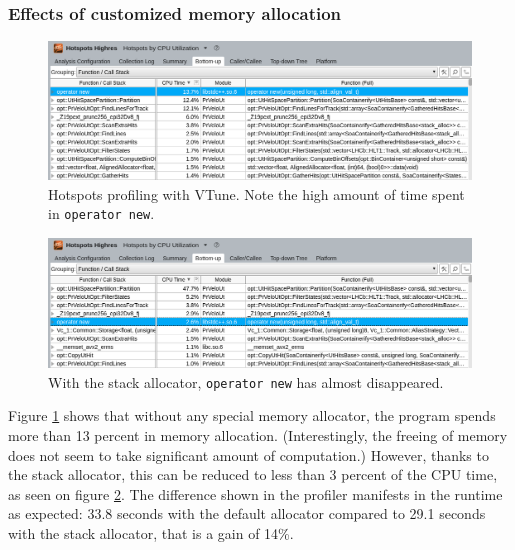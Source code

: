 \documentclass[12pt]{article}
\newcommand{\code}[1]{\texttt{#1}}
\begin{document}
\subsubsection{Effects of customized memory allocation}


\begin{figure}[H]
	\begin{center}
		\includegraphics[width=\textwidth]{velout_without_alloc}
	\end{center}
	\caption[CPU hotspots \textit{without} custom allocator]{Hotspots profiling with VTune. Note the high amount of time spent in \code{operator new}.}
	\label{fig_velout_without_alloc}
\end{figure}


\begin{figure}[H]
	\begin{center}
		\includegraphics[width=\textwidth]{velout_with_alloc}
	\end{center}
	\caption[CPU hotspots \textit{with} custom allocator]{With the stack allocator, \code{operator new} has almost disappeared.}
	\label{fig_velout_with_alloc}
\end{figure}

Figure \ref{fig_velout_without_alloc} shows that without any special memory allocator, the program spends more than 13 percent in memory allocation. (Interestingly, the freeing of memory does not seem to take significant amount of computation.) However, thanks to the stack allocator, this can be reduced to less than 3 percent of the CPU time, as seen on figure \ref{fig_velout_with_alloc}. The difference shown in the profiler manifests in the runtime as expected: 33.8 seconds with the default allocator compared to 29.1 seconds with the stack allocator, that is a gain of 14\%.
\end{document}

